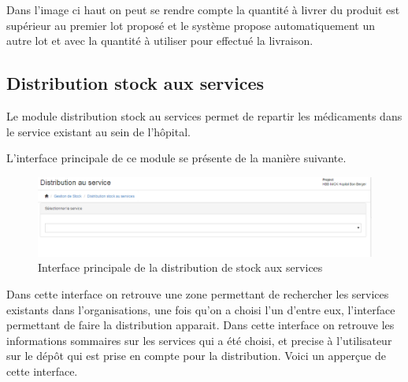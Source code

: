 \documentclass[12pt,a4paper]{report}
\begin{document}
Dans l'image ci haut on peut se rendre compte la quantité à livrer du produit est supérieur au premier lot proposé et le système propose automatiquement un autre lot et avec la quantité à utiliser pour effectué la livraison.

\newpage
\subsection{Distribution stock aux services}
Le module distribution stock au services permet de repartir les médicaments dans le service existant au sein de l'hôpital.

L'interface principale de ce module se présente de la manière suivante. 

\begin{figure}[h]
\begin{center}
\includegraphics[width=14cm]{pic/DistService.png}
\end{center}
\caption{Interface principale de la distribution de stock aux services}
\label{Interface principale de la distribution de stock aux services}
\end{figure}


Dans cette interface on retrouve une zone permettant de rechercher les services existants dans l'organisations, une fois qu'on a choisi l'un d'entre eux, l'interface permettant de faire la distribution apparait. Dans cette interface on retrouve les informations sommaires sur les services qui a été choisi, et precise à l'utilisateur sur le dépôt qui est prise en compte pour la distribution. Voici un apperçue de cette interface.
\end{document}
